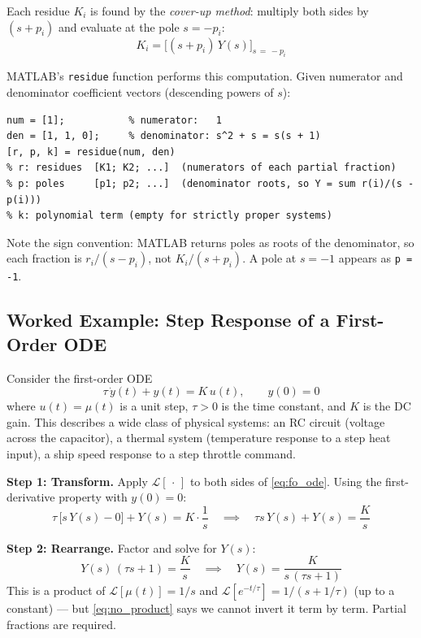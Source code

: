 \documentclass[../../book.tex]{subfiles}
\begin{document}
Each residue $K_i$ is found by the \emph{cover-up method}: multiply both sides
by $(s+p_i)$ and evaluate at the pole $s = -p_i$:
\begin{equation}
  K_i = \bigl[(s+p_i)\,Y(s)\bigr]_{s\,=\,-p_i}
  \label{eq:coverup}
\end{equation}

MATLAB's \texttt{residue} function performs this computation.  Given numerator
and denominator coefficient vectors (descending powers of $s$):
\begin{Verbatim}[frame=single, fontsize=\small]
num = [1];           % numerator:   1
den = [1, 1, 0];     % denominator: s^2 + s = s(s + 1)
[r, p, k] = residue(num, den)
% r: residues  [K1; K2; ...]  (numerators of each partial fraction)
% p: poles     [p1; p2; ...]  (denominator roots, so Y = sum r(i)/(s - p(i)))
% k: polynomial term (empty for strictly proper systems)
\end{Verbatim}

Note the sign convention: MATLAB returns poles as roots of the denominator, so
each fraction is $r_i/(s - p_i)$, not $K_i/(s + p_i)$.  A pole at $s = -1$
appears as \texttt{p = -1}.

\subsection{Worked Example: Step Response of a First-Order ODE}
\label{sec:fo_example}

Consider the first-order ODE
\begin{equation}
  \tau\,\dot{y}(t) + y(t) = K\,u(t), \qquad y(0) = 0
  \label{eq:fo_ode}
\end{equation}
where $u(t) = \mu(t)$ is a unit step, $\tau > 0$ is the time constant, and
$K$ is the DC gain.  This describes a wide class of physical systems: an RC
circuit (voltage across the capacitor), a thermal system (temperature response
to a step heat input), a ship speed response to a step throttle command.

\textbf{Step 1: Transform.}  Apply $\mathcal{L}[\,\cdot\,]$ to both sides of
\cref{eq:fo_ode}.  Using the first-derivative property with $y(0) = 0$:
\[
  \tau\,\bigl[s\,Y(s) - 0\bigr] + Y(s) = K \cdot \frac{1}{s}
  \quad\implies\quad
  \tau s\,Y(s) + Y(s) = \frac{K}{s}
\]

\textbf{Step 2: Rearrange.}  Factor and solve for $Y(s)$:
\[
  Y(s)\,(\tau s + 1) = \frac{K}{s}
  \quad\implies\quad
  Y(s) = \frac{K}{s\,(\tau s + 1)}
\]
This is a product of $\mathcal{L}[\mu(t)] = 1/s$ and $\mathcal{L}[e^{-t/\tau}]
= 1/(s + 1/\tau)$ (up to a constant) --- but \cref{eq:no_product} says we
cannot invert it term by term.  Partial fractions are required.
\end{document}
